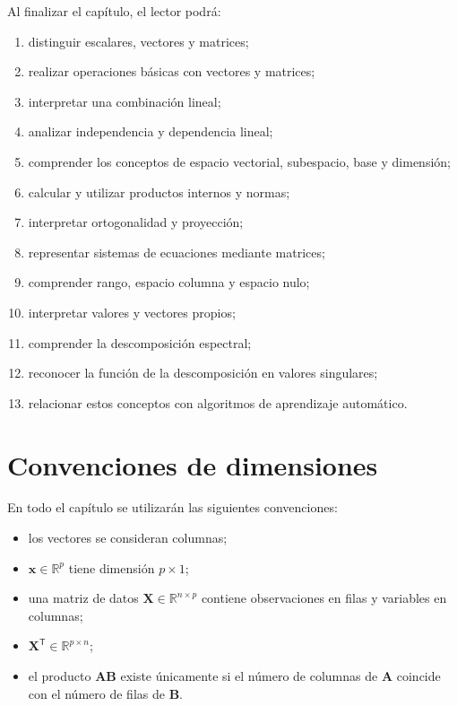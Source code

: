 \documentclass[
  spanish,
  10.5pt,
  letterpaper,
  DIV=11,
  numbers=noendperiod,
  oneside,
  open=any]{scrreprt}
\providecommand{\tightlist}{%
  \setlength{\itemsep}{0pt}\setlength{\parskip}{0pt}}
\theoremstyle{definition}
\theoremstyle{definition}
\theoremstyle{plain}
\theoremstyle{remark}
\begin{document}

Al finalizar el capítulo, el lector podrá:

\begin{enumerate}
\def\labelenumi{\arabic{enumi}.}
\tightlist
\item
  distinguir escalares, vectores y matrices;
\item
  realizar operaciones básicas con vectores y matrices;
\item
  interpretar una combinación lineal;
\item
  analizar independencia y dependencia lineal;
\item
  comprender los conceptos de espacio vectorial, subespacio, base y
  dimensión;
\item
  calcular y utilizar productos internos y normas;
\item
  interpretar ortogonalidad y proyección;
\item
  representar sistemas de ecuaciones mediante matrices;
\item
  comprender rango, espacio columna y espacio nulo;
\item
  interpretar valores y vectores propios;
\item
  comprender la descomposición espectral;
\item
  reconocer la función de la descomposición en valores singulares;
\item
  relacionar estos conceptos con algoritmos de aprendizaje automático.
\end{enumerate}

\section*{Convenciones de
dimensiones}\label{convenciones-de-dimensiones}


En todo el capítulo se utilizarán las siguientes convenciones:

\begin{itemize}
\tightlist
\item
  los vectores se consideran columnas;
\item
  \(\mathbf{x}\in\mathbb{R}^{p}\) tiene dimensión \(p\times1\);
\item
  una matriz de datos
  \(\mathbf{X}\in\mathbb{R}^{n\times p}\) contiene observaciones en
  filas y variables en columnas;
\item
  \(\mathbf{X}^{\mathsf T}\in\mathbb{R}^{p\times n}\);
\item
  el producto \(\mathbf{A}\mathbf{B}\) existe únicamente si el número de
  columnas de \(\mathbf{A}\) coincide con el número de filas de
  \(\mathbf{B}\).
\end{itemize}
\end{document}
